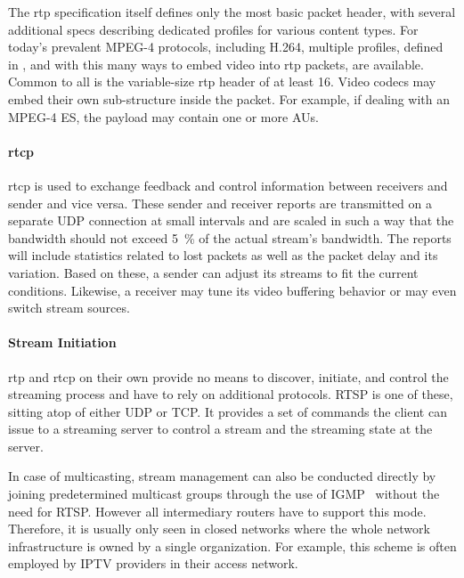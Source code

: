 The \gls{rtp} specification itself defines only the most basic packet header, with several additional specs describing dedicated profiles for various content types. For today's prevalent MPEG-4 protocols, including H.264, multiple profiles, defined in \cite{rfc3640,rfc6184,rfc6416}, and with this many ways to embed video into \gls{rtp} packets, are available. Common to all is the variable-size \gls{rtp} header of at least \SI{16}{\byte}. Video codecs may embed their own sub-structure inside the packet. For example, if dealing with an MPEG-4 \gls{ES}, the payload may contain one or more \glspl{AU}.


\paragraph{\texorpdfstring{\acrshort{rtcp}}{rtcp}}

\gls{rtcp} is used to exchange feedback and control information between receivers and sender and vice versa. These sender and receiver reports are transmitted on a separate \gls{UDP} connection at small intervals and are scaled in such a way that the bandwidth should not exceed \SI{5}{\percent} of the actual stream's bandwidth. The reports will include statistics related to lost packets as well as the packet delay and its variation. Based on these, a sender can adjust its streams to fit the current conditions. Likewise, a receiver may tune its video buffering behavior or may even switch stream sources.


\paragraph{Stream Initiation}

\gls{rtp} and \gls{rtcp} on their own provide no means to discover, initiate, and control the streaming process and have to rely on additional protocols. \gls{RTSP} is one of these, sitting atop of either \gls{UDP} or \gls{TCP}. It provides a set of commands the client can issue to a streaming server to control a stream and the streaming state at the server.

In case of multicasting, stream management can also be conducted directly by joining predetermined multicast groups through the use of \gls{IGMP}~\cite{rfc4604} without the need for \gls{RTSP}. However all intermediary routers have to support this mode. Therefore, it is usually only seen in closed networks where the whole network infrastructure is owned by a single organization. For example, this scheme is often employed by \gls{IPTV} providers in their access network.

